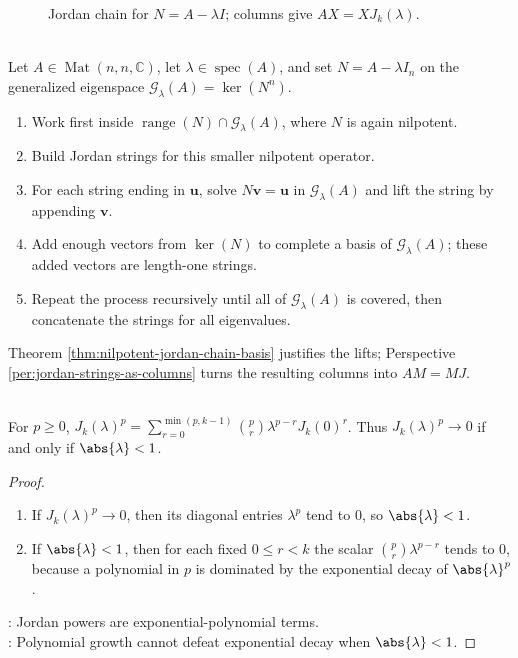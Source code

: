\begin{figure}[H]
  \centering
  
  \caption{Jordan chain for $N=A-\lambda I$; columns give $AX=XJ_k(\lambda)$.}
  \label{fig:jordan-string-columns-similarity}
\end{figure}

\begin{method} \label{meth:filippov-column-space-jordan-strings} \\
Let $A\in\operatorname{Mat}(n,n,\mathbb{C})$, let $\lambda\in\operatorname{spec}(A)$, and set $N=A-\lambda I_n$ on the generalized eigenspace $\mathcal{G}_{\lambda}(A)=\ker(N^n)$.
\begin{enumerate}[label=(\roman*)]
\setlength{\itemsep}{0pt}
\item Work first inside $\operatorname{range}(N)\cap\mathcal{G}_{\lambda}(A)$, where $N$ is again nilpotent.
\item Build Jordan strings for this smaller nilpotent operator.
\item For each string ending in $\mathbf{u}$, solve $N\mathbf{v}=\mathbf{u}$ in $\mathcal{G}_{\lambda}(A)$ and lift the string by appending $\mathbf{v}$.
\item Add enough vectors from $\ker(N)$ to complete a basis of $\mathcal{G}_{\lambda}(A)$; these added vectors are length-one strings.
\item Repeat the process recursively until all of $\mathcal{G}_{\lambda}(A)$ is covered, then concatenate the strings for all eigenvalues.
\end{enumerate}
Theorem \ref{thm:nilpotent-jordan-chain-basis} justifies the lifts; Perspective \ref{per:jordan-strings-as-columns} turns the resulting columns into $AM=MJ$.
\end{method}

\begin{proposition} \label{prop:powers-of-jordan-block} \\
For $p\geq0$, $J_k(\lambda)^p =\sum\limits_{r=0}^{\min(p,k-1)}\binom{p}{r}\lambda^{p-r}J_k(0)^r$. Thus $J_k(\lambda)^p\to0$ if and only if $\abs{\lambda}<1$.
\begin{proof}
\begin{enumerate}[label=\roman*.]
\setlength{\itemsep}{0pt}
\item[$(\Rightarrow)$] If $J_k(\lambda)^p\to0$, then its diagonal entries $\lambda^p$ tend to $0$, so $\abs{\lambda}<1$.
\item[$(\Leftarrow)$] If $\abs{\lambda}<1$, then for each fixed $0\leq r<k$ the scalar $\binom{p}{r}\lambda^{p-r}$ tends to $0$, because a polynomial in $p$ is dominated by the exponential decay of $\abs{\lambda}^{p}$.
\end{enumerate}
: Jordan powers are exponential-polynomial terms.\\
: Polynomial growth cannot defeat exponential decay when $\abs{\lambda}<1$.
\end{proof}
\end{proposition}

